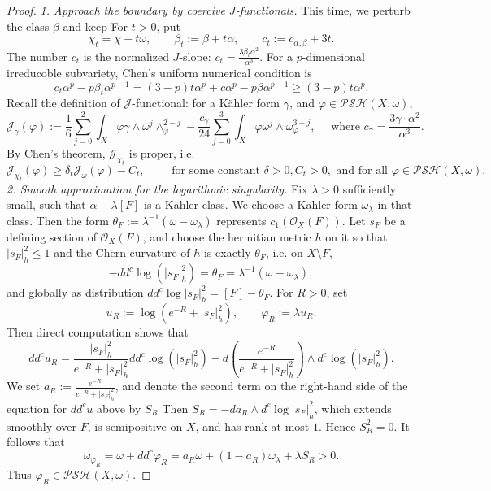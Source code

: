 \documentclass[reqno]{amsart}
\theoremstyle{remark}
\newcommand{\ddc}{dd^c}
\newcommand{\Psh}{\mathcal{PSH}}
\newcommand{\cab}{c_{\alpha,\beta}}
\def\cJ{{\mathcal J}}
\def\cO{{\mathcal O}}
\theoremstyle{plain}
\begin{document}
\begin{proof}
\noindent\emph{1. Approach the boundary by coercive $J$-functionals.} This time, we perturb the class $\beta$ and keep 
    For $t>0$, put \[
    \chi_t=\chi+t\omega, \qquad \beta_t:=\beta+t\alpha,\qquad c_t:=\cab+3t.
    \]The number $c_t$ is the normalized $J$-slope: $c_t=\frac{3\beta_t\alpha^2}{\alpha^3}$.
For a $p$-dimensional irreducoble subvariety, Chen's uniform numerical condition \cite{C21} is \[
c_t\alpha^p-p\beta_t\alpha^{p-1}=(3-p)t\alpha^p+c\alpha^p-p\beta\alpha^{p-1}\geq (3-p)t\alpha^p.
\]
Recall the definition of $\cJ$-functional: for a K\"ahler form $\gamma$, and $\varphi\in \Psh(X,\omega)$, \begin{equation}\label{eq:J-functional}
    \cJ_\gamma(\varphi):=\frac{1}{6}\sum_{j=0}^2\int_X\varphi\gamma\wedge\omega^{j}\wedge_\varphi^{2-j}-\frac{c_\gamma}{24}\sum_{j=0}^3\int_X\varphi\omega^j\wedge\omega_\varphi^{3-j}, \quad \text{ where }c_\gamma=\frac{3\gamma\cdot \alpha^2}{\alpha^3}.
\end{equation}
By Chen's theorem, $\cJ_{\chi_t}$ is proper, i.e.  \begin{equation}\label{eq:Chen-coercivity}
    \cJ_{\chi_t}(\varphi)\geq \delta_t\cJ_\omega(\varphi)-C_t, \qquad \text{ for some constant }\delta>0,C_t>0, \text{ and for all }\varphi\in \Psh(X,\omega). 
\end{equation}
\smallskip
\noindent\emph{2. Smooth approximation for the logarithmic singularity.}
 Fix $\lambda>0$ sufficiently small, such that $\alpha-\lambda[F]$ is a K\"ahler class. We choose a K\"ahler form $\omega_\lambda$ in that class. Then the form $\theta_F:=\lambda^{-1}(\omega-\omega_\lambda)$ represents $c_1(\cO_X(F))$. Let $s_F$ be a defining section of $\cO_X(F)$, and choose the hermitian metric $h$ on it so that $|s_F|_h^2\leq 1$ and the Chern curvature of $h$ is exactly $\theta_F$, i.e. on $X\setminus F$, \[
-\ddc\log(|s_F|_h^2)=\theta_F=\lambda^{-1}(\omega-\omega_\lambda),
\]  and globally as distribution $\ddc\log|s_F|_h^2=[F]-\theta_F$. For $R>0$, set \[
u_R:=\log(e^{-R}+|s_F|_h^2), \qquad \varphi_R:=\lambda u_R.
\]
Then direct computation shows that\begin{equation}
    \ddc u_R=\frac{|s_F|_h^2}{e^{-R}+|s_F|_h^2}\ddc\log(|s_F|_h^2)-d\left(\frac{e^{-R}}{e^{-R}+|s_F|_h^2}\right)\wedge d^c\log(|s_F|_h^2).
\end{equation} 
We set $a_R:=\frac{e^{-R}}{e^{-R}+|s_F|_h^2}$, and denote the second term on the right-hand side of the equation for $\ddc u$ above by $S_R$ Then $S_R=-da_R\wedge d^c\log|s_F|_h^2$, which extends smoothly over $F$, is semipositive on $X$, and has rank at most $1$. Hence $S_R^2=0$. It follows that \begin{equation}
    \omega_{\varphi_R}=\omega+\ddc\varphi_R=a_R\omega+(1-a_R)\omega_\lambda+\lambda S_R>0.
\end{equation}
Thus $\varphi_R\in \Psh(X,\omega)$.


\end{proof}
\end{document}
